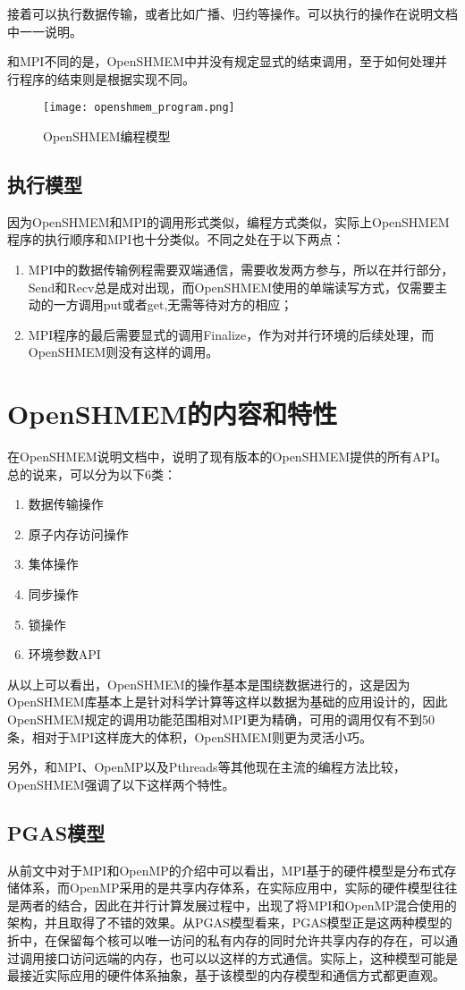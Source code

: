 接着可以执行数据传输，或者比如广播、归约等操作。可以执行的操作在说明文档\cite{site:openshmem_spec}中一一说明。

和MPI不同的是，OpenSHMEM中并没有规定显式的结束调用，至于如何处理并行程序的结束则是根据实现不同。
\begin{figure}
\centering
\texttt{[image: openshmem\_program.png]}
\caption{OpenSHMEM编程模型}\label{fig:openshmem_program}
\end{figure}
\subsection{执行模型}
因为OpenSHMEM和MPI的调用形式类似，编程方式类似，实际上OpenSHMEM程序的执行顺序和MPI也十分类似。不同之处在于以下两点：
\begin{enumerate}
\item MPI中的数据传输例程需要双端通信，需要收发两方参与，所以在并行部分，Send和Recv总是成对出现，而OpenSHMEM使用的单端读写方式，仅需要主动的一方调用put或者get,无需等待对方的相应；
\item MPI程序的最后需要显式的调用Finalize，作为对并行环境的后续处理，而OpenSHMEM则没有这样的调用。
\end{enumerate}
\section{OpenSHMEM的内容和特性}
在OpenSHMEM说明文档\cite{site:openshmem_spec}中，说明了现有版本的OpenSHMEM提供的所有API。总的说来，可以分为以下6类：
\begin{enumerate}
\item 数据传输操作
\item 原子内存访问操作
\item 集体操作
\item 同步操作
\item 锁操作
\item 环境参数API
\end{enumerate}
从以上可以看出，OpenSHMEM的操作基本是围绕数据进行的，这是因为OpenSHMEM库基本上是针对科学计算等这样以数据为基础的应用设计的，因此OpenSHMEM规定的调用功能范围相对MPI更为精确，可用的调用仅有不到50条，相对于MPI这样庞大的体积，OpenSHMEM则更为灵活小巧。

另外，和MPI、OpenMP以及Pthreads等其他现在主流的编程方法比较，OpenSHMEM强调了以下这样两个特性。
\subsection{PGAS模型}
从前文中对于MPI和OpenMP的介绍中可以看出，MPI基于的硬件模型是分布式存储体系，而OpenMP采用的是共享内存体系，在实际应用中，实际的硬件模型往往是两者的结合，因此在并行计算发展过程中，出现了将MPI和OpenMP混合使用的架构，并且取得了不错的效果\cite{jour:hybrid}。从PGAS模型看来，PGAS模型正是这两种模型的折中，在保留每个核可以唯一访问的私有内存的同时允许共享内存的存在，可以通过调用接口访问远端的内存，也可以以这样的方式通信。实际上，这种模型可能是最接近实际应用的硬件体系抽象，基于该模型的内存模型和通信方式都更直观。

